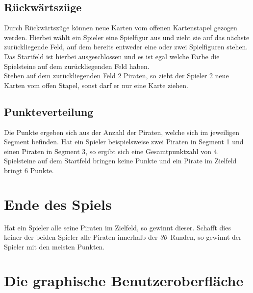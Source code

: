 \documentclass{scrartcl}
\newcommand{\RundenAnzahl}{\emph{30}}
\begin{document}
	\subsection{Rückwärtszüge}
	Durch Rückwärtszüge können neue Karten vom offenen Kartenstapel gezogen werden.
	Hierbei wählt ein Spieler eine Spielfigur aus und zieht sie auf das nächste
	zurückliegende Feld, auf dem bereits entweder eine oder zwei Spielfiguren
	stehen. Das Startfeld ist hierbei ausgeschlossen und es ist egal welche Farbe
	die Spielsteine auf dem zurückliegenden Feld haben.\\
	Stehen auf dem zurückliegenden Feld 2 Piraten, so zieht der Spieler 2 neue
	Karten vom offen Stapel, sonst darf er nur eine Karte ziehen.
	\subsection{Punkteverteilung}
	Die Punkte ergeben sich aus der Anzahl der Piraten, welche sich im jeweiligen
	Segment befinden. Hat ein Spieler beispielsweise zwei Piraten in Segment 1 und
	einen Piraten in Segment 3, so ergibt sich eine Gesamtpunktzahl von 4.\\
	Spielsteine auf dem Startfeld bringen keine Punkte und ein Pirate im Zielfeld
	bringt 6 Punkte.
\section{Ende des Spiels}
	Hat ein Spieler alle seine Piraten im Zielfeld, so gewinnt dieser. Schafft dies
	keiner der beiden Spieler alle Piraten innerhalb der \RundenAnzahl\ Runden, so
	gewinnt der Spieler mit den meisten Punkten.
\section{Die graphische Benutzeroberfläche}
	
\end{document}
